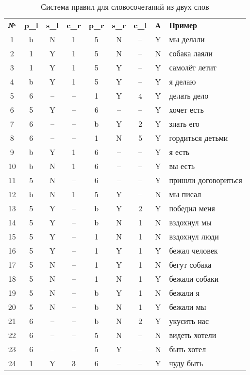 \documentclass[main]{subfiles}
\begin{document}
\begin{longtable}[c]{|c|c|c|c|c|c|c|c|p{110px}|}
		\captionsetup{format=hang,labelsep = endash, singlelinecheck=false}
	\caption{Система правил для словосочетаний из двух слов}\label{tab1}\\
			\hline
			\textbf{№}&\textbf{ p\_l} &\textbf{s\_l}  &\textbf{c\_r} & \textbf{p\_r }&\textbf{s\_r }& \textbf{c\_l} & \textbf{A}  &\textbf{Пример} \\ \hline
			1 & b & N & 1 & 5 & N & --  & Y  & мы делали \\ \hline
			2 &  1 &Y & 1 & 5 & N & -- & N & собака лаяли\\ \hline
			3 & 1 & Y & 1 & 5 & Y & -- & Y & самолёт летит\\ \hline 
			4 & b & Y & 1 & 5 & Y & -- & Y & я делаю \\ \hline
			5&6&--&--&1&Y&4&Y&делать дело\\ \hline
			6&5&Y&--&6&--&--&Y&хочет есть\\ \hline
			7&6&--&--&b&Y&2&Y&знать его\\ \hline
			8&6&--&--&1&N&5&Y&гордиться детьми\\ \hline
			9&b&Y&1&6&--&--&Y&я есть\\ \hline
			10&b&N&1&6&--&--&Y&вы есть \\ \hline
			11&5&N&--&6&--&--&Y&пришли договориться\\ \hline
			12&b&N&1&5&Y&--&N&мы писал\\ \hline
			13&5&Y&--&b&Y&2&Y&победил меня\\ \hline
			14&5&Y&--&b&N&1&N&вздохнул мы\\ \hline
			15&5&Y&--&1&N&1&N&вздохнул люди\\ \hline
			16&5&Y&--&1&Y&1&Y&бежал человек \\ \hline
			17&5&N&--&1&Y&1&N&бегут собака\\ \hline
			18&5&N&--&1&N&1&Y& бежали собаки\\ \hline
			19&5&N&--&b&Y&1&N&бежали я\\ \hline
			20&5&N&--&b&N&1&Y&бежали мы\\ \hline
			21&6&--&--&b&N&2&Y&укусить нас\\ \hline
			22&6&--&--&5&N&--&N&видеть хотели\\ \hline
			23&6&--&--&5&Y&--&N&быть хотел\\ \hline
			24&1&Y&3&6&--&--&Y&чуду быть\\ \hline

\end{longtable}
\end{document}
